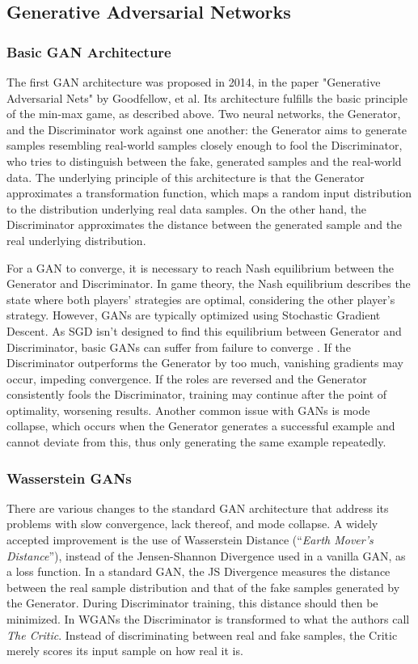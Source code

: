 \documentclass[../main]{subfiles}
\begin{document}
\subsection{Generative Adversarial Networks}

\subsubsection{Basic GAN Architecture}

The first GAN architecture was proposed in 2014, in the paper "Generative Adversarial Nets" by Goodfellow, et al.  Its architecture fulfills the basic principle of the min-max game, as described above. Two neural networks, the Generator, and the Discriminator work against one another: the Generator aims to generate samples resembling real-world samples closely enough to fool the Discriminator, who tries to distinguish between the fake, generated samples and the real-world data. The underlying principle of this architecture is that the Generator approximates a transformation function, which maps a random input distribution to the distribution underlying real data samples. On the other hand, the Discriminator approximates the distance between the generated sample and the real underlying distribution.  \cite{goodfellow2014generative} \cite{Wang2019}

For a GAN to converge, it is necessary to reach Nash equilibrium between the Generator and Discriminator. In game theory, the Nash equilibrium describes the state where both players' strategies are optimal, considering the other player's strategy.  However, GANs are typically optimized using Stochastic Gradient Descent. As SGD isn't designed to find this equilibrium between Generator and Discriminator, basic GANs can suffer from failure to converge \cite{goodfellow2018}. If the Discriminator outperforms the Generator by too much,  vanishing gradients may occur,  impeding convergence. If the roles are reversed and the Generator consistently fools the Discriminator, training may continue after the point of optimality, worsening results. Another common issue with GANs is mode collapse, which occurs when the Generator generates a successful example and cannot deviate from this, thus only generating the same example repeatedly.

\subsubsection{Wasserstein GANs \cite{wgans}}
There are various changes to the standard GAN architecture that address its problems with slow convergence, lack thereof, and mode collapse. A widely accepted improvement is the use of Wasserstein Distance (\enquote{\textit{Earth Mover's Distance}}), instead of the Jensen-Shannon Divergence used in a vanilla GAN, as a loss function.  In a standard GAN, the JS Divergence measures the distance between the real sample distribution and that of the fake samples generated by the Generator. During Discriminator training, this distance should then be minimized. In WGANs the Discriminator is transformed to what the authors call \textit{The Critic}. Instead of discriminating between real and fake samples, the Critic merely scores its input sample on how real it is.  
\end{document}
